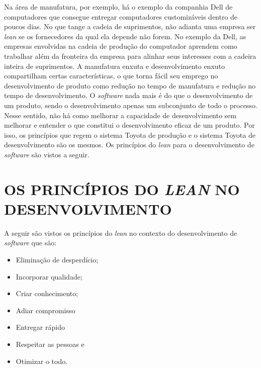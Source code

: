 Na área de manufatura, por exemplo, há o exemplo da companhia Dell de computadores que consegue entregar computadores customizáveis dentro de poucos dias. No que tange a cadeia de suprimentos, não adianta uma empresa ser \textit{lean} se os fornecedores da qual ela depende não forem. No exemplo da Dell, as empresas envolvidas na cadeia de produção do computador aprendem como trabalhar além da fronteira da empresa para alinhar seus interesses com a cadeira inteira de suprimentos. A manufatura enxuta e desenvolvimento enxuto compartilham certas características, o que torna fácil seu emprego no desenvolvimento de produto como redução no tempo de manufatura e redução no tempo de desenvolvimento. O \textit{software} nada mais é do que o desenvolvimento de um produto, sendo o desenvolvimento apenas um subconjunto de todo o processo. Nesse sentido, não há como melhorar a capacidade de desenvolvimento sem melhorar e entender o que constitui o desenvolvimento eficaz de um produto. Por isso, os princípios que regem o sistema Toyota de produção e o sistema Toyota de desenvolvimento são os mesmos. Os princípios do \textit{lean} para o desenvolvimento de \textit{software} são vistos a seguir.

\section{OS PRINCÍPIOS DO \textit{LEAN} NO DESENVOLVIMENTO}

A seguir são vistos os princípios do \textit{lean} no contexto do desenvolvimento de \textit{software} que são: 

\begin{itemize}
	\item Eliminação de desperdício;
	\item Incorporar qualidade;
	\item Criar conhecimento;
	\item Adiar compromisso 
	\item Entregar rápido
	\item Respeitar as pessoas e
	\item Otimizar o todo.
\end{itemize}

